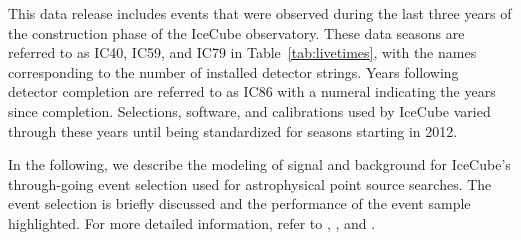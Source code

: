 \documentclass[aps,10pt,prd,twocolumn,floats,letterpaper,showpacs,nofootinbib,bibnotes,notitlepage,superscriptaddress,floatfix]{revtex4-1}
\newcommand{\MA}[1]{{\color{black}#1}}
\begin{document}
This data release includes events that were observed during the last three years of the construction phase of the IceCube observatory. These data seasons are referred to as IC40, IC59, and IC79 in Table~\ref{tab:livetimes}, with the names corresponding to the number of installed detector strings. Years following detector completion are referred to as IC86 with a numeral indicating the years since completion. Selections, software, and calibrations used by IceCube varied through these years until being standardized for seasons starting in 2012. 

In the following, we describe the modeling of signal and background for IceCube's through-going event selection used for astrophysical point source searches. The event selection is briefly discussed and the performance of the event sample highlighted. For more detailed information, refer to \cite{Abbasi:2010rd}, \cite{Aartsen:2013uuv}, and \cite{Aartsen:2014cva}.



\end{document}
